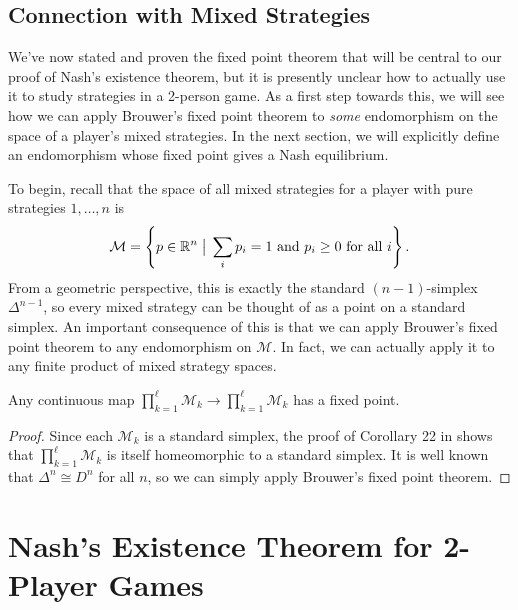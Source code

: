 \documentclass[twoside,10pt]{article}
\begin{document}
\subsection{Connection with Mixed Strategies}

We've now stated and proven the fixed point theorem that will be central to our proof of Nash's existence theorem, but it is presently unclear how to actually use it to study strategies in a 2-person game. As a first step towards this, we will see how we can apply Brouwer's fixed point theorem to \textit{some} endomorphism on the space of a player's mixed strategies. In the next section, we will explicitly define an endomorphism whose fixed point gives a Nash equilibrium.

To begin, recall that the space of all mixed strategies for a player with pure strategies $1, \dots, n$ is
\[
	\mathcal{M} = \left\{ p \in \mathbb{R}^{n} \;\big|\; \sum_i p_i = 1 \text{ and } p_i \geq 0 \text{ for all } i \right\}.
\] 
From a geometric perspective, this is exactly the standard $(n-1)$-simplex $\Delta^{n-1}$, so every mixed strategy can be thought of as a point on a standard simplex. An important consequence of this is that we can apply Brouwer's fixed point theorem to any endomorphism on $\mathcal{M}$. In fact, we can actually apply it to any finite product of mixed strategy spaces.

\begin{lem}
	\label{mixed-strat-fixed-pt}
	Any continuous map $\prod_{k=1}^{\ell}\mathcal{M}_k \to \prod_{k=1}^{\ell}\mathcal{M}_k$ has a fixed point.
\end{lem}
\begin{proof}
	Since each $\mathcal{M}_{k}$ is a standard simplex, the proof of Corollary 22 in \cite{tutorial} shows that $\prod_{k=1}^{\ell}\mathcal{M}_{k}$ is itself homeomorphic to a standard simplex. It is well known that $\Delta^{n} \cong D^{n}$ for all $n$, so we can simply apply Brouwer's fixed point theorem.
\end{proof}

\section{Nash's Existence Theorem for 2-Player Games}
\end{document}
